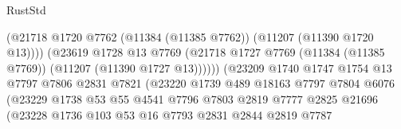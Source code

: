 \begin{lexlean}{RustStd}
\begin{coremodule}
                                            (@21718
                                              @1720
                                              @7762
                                              (@11384 (@11385 @7762))
                                              (@11207 (@11390 @1720 @13))))
                                          (@23619
                                            @1728
                                            @13
                                            @7769
                                            (@21718
                                              @1727
                                              @7769
                                              (@11384 (@11385 @7769))
                                              (@11207 (@11390 @1727 @13))))))
                                      (@23209
                                        @1740
                                        @1747
                                        @1754
                                        @13
                                        @7797
                                        @7806
                                        @2831
                                        @7821
                                        (@23220
                                          @1739
                                          @489
                                          @18163
                                          @7797
                                          @7804
                                          @6076
                                          (@23229
                                            @1738
                                            @53
                                            @55
                                            @4541
                                            @7796
                                            @7803
                                            @2819
                                            @7777
                                            @2825
                                            @21696
                                            (@23228
                                              @1736
                                              @103
                                              @53
                                              @16
                                              @7793
                                              @2831
                                              @2844
                                              @2819
                                              @7787

\end{coremodule}
\end{lexlean}
